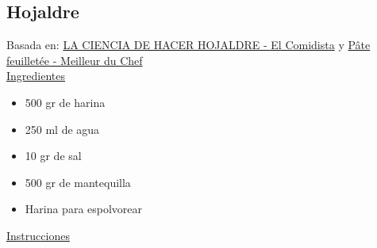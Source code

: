 \subsection{Hojaldre}

Basada en: \href{https://elcomidista.elpais.com/elcomidista/2017/02/08/receta/1486577378_084473.html}{LA CIENCIA DE HACER HOJALDRE - El Comidista} y  \href{https://www.meilleurduchef.com/fr/recette/pate-feuilletee.html}{Pâte feuilletée - Meilleur du Chef}\\

\underline{Ingredientes}

\begin{itemize}
\item 500 gr de harina
\item 250 ml de agua
\item 10 gr de sal
\item 500 gr de mantequilla
\item Harina para espolvorear
\end{itemize}

\underline{Instrucciones}

